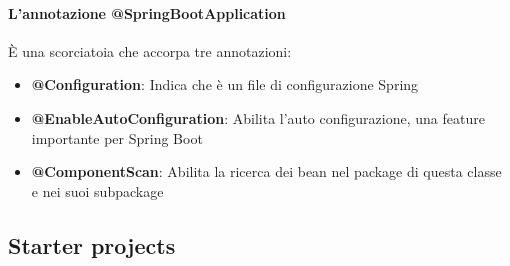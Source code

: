 \documentclass[11pt,a4paper]{book}
\begin{document}
\paragraph{L'annotazione @SpringBootApplication}
È una scorciatoia che accorpa tre annotazioni:
\begin{itemize}
	\item \textbf{@Configuration}: Indica che è un file di configurazione Spring
	\item \textbf{@EnableAutoConfiguration}: Abilita l'auto configurazione, una feature importante per Spring Boot
	\item \textbf{@ComponentScan}: Abilita la ricerca dei bean nel package di questa classe e nei suoi subpackage
\end{itemize}

\subsection{Starter projects}
\end{document}
